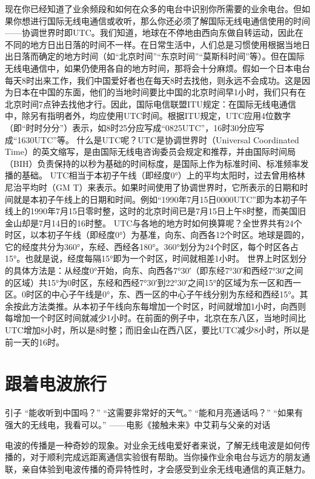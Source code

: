 \documentclass[12pt,UTF8]{ctexbook}
\begin{document}
现在你已经知道了业余频段和如何在众多的电台中识别你所需要的业余电台。但如果你想进行国际无线电通信或收听，那么你还必须了解国际无线电通信使用的时间——协调世界时即UTC。我们知道，地球在不停地由西向东做自转运动，因此在不同的地方日出日落的时间不一样。在日常生活中，人们总是习惯使用根据当地日出日落而确定的地方时间（如“北京时间”“东京时间”“莫斯科时间”等）。但在国际无线电通信中，如果仍使用各自的地方时间，那将会十分麻烦。假如一个日本电台每天8时出来工作，我们中国爱好者也在每天8时去找他，则永远不会成功。这是因为日本在中国的东面，他们的当地时间要比中国的北京时间早1小时，我们只有在北京时间7点钟去找他才行。因此，国际电信联盟ITU规定：在国际无线电通信中，除另有指明者外，均应使用UTC时间。根据ITU规定，UTC应用4位数字（即“时时分分”）表示，如8时25分应写成“0825UTC”，16时30分应写成“1630UTC”等。
什么是UTC呢？UTC是协调世界时（Universal Coordinated Time）的英文缩写，是由国际无线电咨询委员会规定和推荐，并由国际时间局（BIH）负责保持的以秒为基础的时间标度，是国际上作为标准时间、标准频率发播的基础。
UTC相当于本初子午线（即经度0°）上的平均太阳时，过去曾用格林尼治平均时（GM T）来表示。如果时间使用了协调世界时，它所表示的日期和时间就是本初子午线上的日期和时间。例如“1990年7月15日0000UTC”即为本初子午线上的1990年7月15日零时整，这时的北京时间已是7月15日上午8时整，而美国旧金山却是7月14日的16时整。
UTC与各地的地方时如何换算呢？全世界共有24个时区，以本初子午线（即经度0°）为基准，向东、向西各12个时区。地球是圆的，它的经度共分为360°，东经、西经各180°。360°划分为24个时区，每个时区各占15°。也就是说，经度每隔15°即为一个时区，时间就相差1小时。
世界上时区划分的具体方法是：从经度0°开始，向东、向西各7°30′（即东经7°30′和西经7°30′之间的区域）共15°为0时区，东经和西经7°30′到22°30′之间15°的区域为东一区和西一区。0时区的中心子午线是0°，东、西一区的中心子午线分别为东经和西经15°。其余按此方法类推。从本初子午线向东每增加一个时区，时间就增加1小时，向西则每增加一个时区时间就减少1小时。在前面的例子中，北京在东八区，当地时间比UTC增加8小时，所以是8时整；而旧金山在西八区，要比UTC减少8小时，所以是前一天的16时。

\chapter{跟着电波旅行}

引子
“能收听到中国吗？”
“这需要非常好的天气。”
“能和月亮通话吗？”
“如果有强大的无线电，我看可以。”
——电影《接触未来》中艾莉与父亲的对话

电波的传播是一种奇妙的现象。对业余无线电爱好者来说，了解无线电波是如何传播的，对于顺利完成远距离通信实验很有帮助。当你操作业余电台与远方的朋友通联，亲自体验到电波传播的奇异特性时，才会感受到业余无线电通信的真正魅力。
\end{document}
